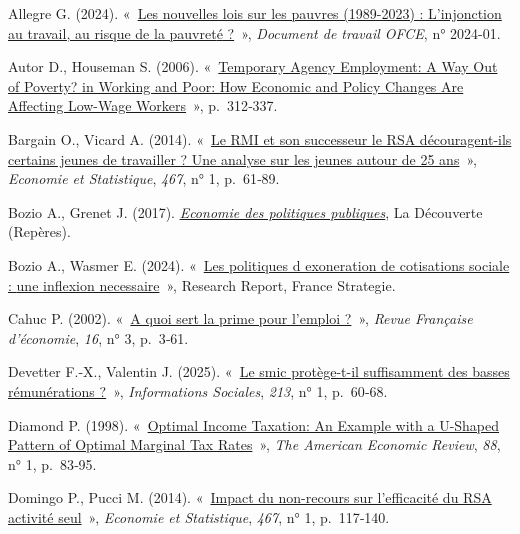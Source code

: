\documentclass[
  french,
]{article}
\newlength{\cslhangindent}
\newenvironment{CSLReferences}[2] %
 {\begin{list}{}{%
  \setlength{\itemindent}{0pt}
  \setlength{\leftmargin}{0pt}
  \setlength{\parsep}{0pt}
  \ifodd #1
   \setlength{\leftmargin}{\cslhangindent}
   \setlength{\itemindent}{-1\cslhangindent}
  \fi
  \setlength{\itemsep}{#2\baselineskip}}}
 {\end{list}}
\renewenvironment{CSLReferences}[2] %
    {\begin{list}{}{%
          \setlength{\itemindent}{0pt}
          \setlength{\leftmargin}{0pt}
          \setlength{\parsep}{0pt}
          \ifodd #1
          \setlength{\leftmargin}{\cslhangindent}
          \setlength{\itemindent}{-1\cslhangindent}
          \fi
          \setlength{\itemsep}{0.25\baselineskip}}} %
    {\end{list}}
\begin{document}
\protect{}\label{refs}
\begin{CSLReferences}{0}{1}
Allegre G. (2024).
{«~\href{https://sciencespo.hal.science/hal-04395802}{{Les nouvelles
lois sur les pauvres (1989-2023) : L'injonction au travail, au risque de
la pauvret{é} ?}}~»}, \emph{Document de travail OFCE}, n° 2024-01.

Autor D., Houseman S. (2006).
{«~\href{https://ideas.repec.org/h/upj/uchaps/snhrsf06.html}{Temporary
Agency Employment: A Way Out of Poverty? in Working and Poor: How
Economic and Policy Changes Are Affecting Low-Wage Workers}~»},
p.~312‑337.

Bargain O., Vicard A. (2014).
{«~\href{https://doi.org/10.3406/estat.2014.10247}{Le RMI et son
successeur le RSA découragent-ils certains jeunes de travailler ? Une
analyse sur les jeunes autour de 25 ans}~»}, \emph{Economie et
Statistique}, \emph{467}, n° 1, p.~61‑89.

Bozio A., Grenet J. (2017).
\emph{\href{https://pjse.hal.science/hal-01784362}{{Economie des
politiques publiques}}}, {La Découverte} (Repères).

Bozio A., Wasmer E. (2024).
{«~\href{https://www.strategie-plan.gouv.fr/files/files/Publications/Rapport/rapport_vffff_241003.pdf}{{Les
politiques d exoneration de cotisations sociale} : {une inflexion
necessaire}}~»}, Research Report, France Strategie.

Cahuc P. (2002). {«~\href{https://doi.org/10.3406/rfeco.2002.1513}{A
quoi sert la prime pour l'emploi ?}~»}, \emph{Revue Française
d'économie}, \emph{16}, n° 3, p.~3‑61.

Devetter F.-X., Valentin J. (2025).
{«~\href{https://shs.cairn.info/revue-informations-sociales-2025-1-page-60?lang=fr}{Le
smic protège-t-il suffisamment des basses rémunérations ?}~»},
\emph{Informations Sociales}, \emph{213}, n° 1, p.~60‑68.

Diamond P. (1998). {«~\href{http://www.jstor.org/stable/116819}{Optimal
Income Taxation: An Example with a U-Shaped Pattern of Optimal Marginal
Tax Rates}~»}, \emph{The American Economic Review}, \emph{88}, n° 1,
p.~83‑95.

Domingo P., Pucci M. (2014).
{«~\href{https://doi.org/10.3406/estat.2014.10249}{Impact du non-recours
sur l'efficacité du RSA activité seul}~»}, \emph{Economie et
Statistique}, \emph{467}, n° 1, p.~117‑140.


\end{CSLReferences}
\end{document}
